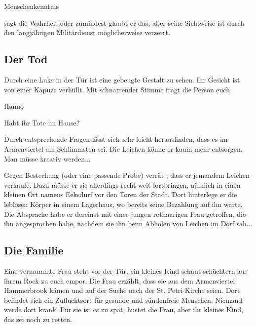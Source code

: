 \begin{probe-box}{Menschenkenntnis}{}

 sagt die Wahrheit oder zumindest glaubt er das, aber seine
Sichtweise ist durch den langjährigen Militärdienst möglicherweise verzerrt.

\end{probe-box}

\subsection{Der Tod}
\label{ssec:tod}

Durch eine Luke in der Tür ist eine gebeugte Gestalt zu sehen. Ihr Gesicht ist
von einer Kapuze verhüllt. Mit schnarrender Stimme fragt die Person euch

\begin{say-box}{Hanno}

Habt ihr Tote im Hause?

\end{say-box}

Durch entsprechende Fragen lässt sich sehr leicht herausfinden, dass es im
Armenviertel am Schlimmsten sei. Die Leichen könne er kaum mehr entsorgen. Man
müsse kreativ werden...

\begin{info-box}

Gegen Bestechung (oder eine passende Probe) verrät , dass er
jemandem Leichen verkaufe. Dazu müsse er sie allerdings recht weit fortbringen,
nämlich in einen kleinen Ort namens Eeksdurf vor den Toren der Stadt. Dort hinterlege
er die leblosen Körper in einem Lagerhaus, wo bereits seine Bezahlung auf ihn
warte. Die Absprache habe er dereinst mit einer jungen rothaarigen Frau getroffen,
die ihn angesprochen habe, nachdem sie ihn beim Abholen von Leichen im Dorf sah...

\end{info-box}

\subsection{Die Familie}
\label{ssec:familie}

Eine vermummte Frau steht vor der Tür, ein kleines Kind schaut schüchtern aus ihrem
Rock zu euch empor. Die Frau erzählt, dass sie aus dem Armenviertel Hammerbrook
kämen und auf der Suche nach der St. Petri-Kirche seien. Dort befindet sich ein
Zufluchtsort für gesunde und sündenfreie Menschen. Niemand werde dort krank! Für sie
ist es zu spät, hustet die Frau, aber ihr kleines Kind, das sei noch zu retten.

